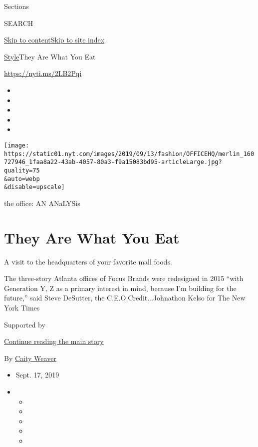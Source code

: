 Sections

SEARCH

\protect\hyperlink{site-content}{Skip to
content}\protect\hyperlink{site-index}{Skip to site index}

\href{/section/style}{Style}\textbar{}They Are What You Eat

\url{https://nyti.ms/2LB2Pqi}

\begin{itemize}
\item
\item
\item
\item
\item
\end{itemize}

\texttt{[image: https://static01.nyt.com/images/2019/09/13/fashion/OFFICEHQ/merlin\_160727946\_1faa8a22-43ab-4057-80a3-f9a15083bd95-articleLarge.jpg?quality=75\\\&auto=webp\\\&disable=upscale]}

the office: AN ANaLYSis

\hypertarget{they-are-what-you-eat}{%
\section{They Are What You Eat}\label{they-are-what-you-eat}}

A visit to the headquarters of your favorite mall foods.

The three-story Atlanta offices of Focus Brands were redesigned in 2015
``with Generation Y, Z as a primary interest in mind, because I'm
building for the future,'' said Steve DeSutter, the
C.E.O.Credit...Johnathon Kelso for The New York Times

Supported by

\protect\hyperlink{after-sponsor}{Continue reading the main story}

By \href{https://www.nytimes.com/by/caity-weaver}{Caity Weaver}

\begin{itemize}
\item
  Sept. 17, 2019
\item
  \begin{itemize}
  \item
  \item
  \item
  \item
  \item
  \end{itemize}
\end{itemize}

